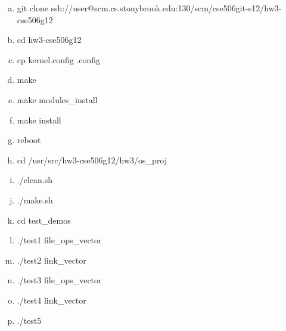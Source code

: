 \documentclass[11pt]{article}
\begin{document}
\begin{enumerate}[(a)]
\item
git clone ssh://user@scm.cs.stonybrook.edu:130/scm/cse506git-s12/hw3-cse506g12
\item
cd hw3-cse506g12
\item
cp kernel.config .config
\item
make
\item
make modules\_install 
\item
make install
\item
reboot
\item
cd /usr/src/hw3-cse506g12/hw3/os\_proj
\item
./clean.sh
\item
./make.sh
\item
cd test\_demos
\item
./test1 file\_ops\_vector
\item
./test2 link\_vector
\item
./test3 file\_ops\_vector
\item
./test4 link\_vector
\item
./test5
\end{enumerate}
\end{document}
